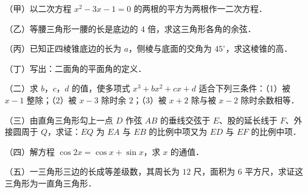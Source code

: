 

\par\medskip


\begin{question}
（甲）以二次方程 $x^2-3x-1=0$ 的两根的平方为两根作一二次方程．

\end{question}
\begin{question}
（乙）等腰三角形一腰的长是底边的 $4$ 倍，求这三角形各角的余弦．

\end{question}
\begin{question}
（丙）已知正四棱锥底边的长为 $a$，侧棱与底面的交角为 $45^\circ$，求这棱锥的高．

\end{question}
\begin{question}
（丁）写出：二面角的平面角的定义．

\par\medskip

\end{question}

\begin{question}
（二）求 $b$，$c$，$d$ 的值，使多项式 $x^3+bx^2+cx+d$ 适合下列三条件：（1）被 $x-1$ 整除；（2）被 $x-3$ 除时余 $2$；（3）被 $x+2$ 除与被 $x-2$ 除时余数相等．

\end{question}
\begin{question}
（三）由直角三角形勾上一点 $D$ 作弦 $AB$ 的垂线交弦于 $E$、股的延长线于 $F$、外接圆周于 $Q$，求证：$EQ$ 为 $EA$ 与 $EB$ 的比例中项又为 $ED$ 与 $EF$ 的比例中项．

\end{question}
\begin{question}
（四）解方程 $\cos2x=\cos x+\sin x$，求 $x$ 的通值．

\end{question}
\begin{question}
（五）一三角形三边的长成等差级数，其周长为 $12$ 尺，面积为 $6$ 平方尺，求证这三角形为一直角三角形．

\end{question}